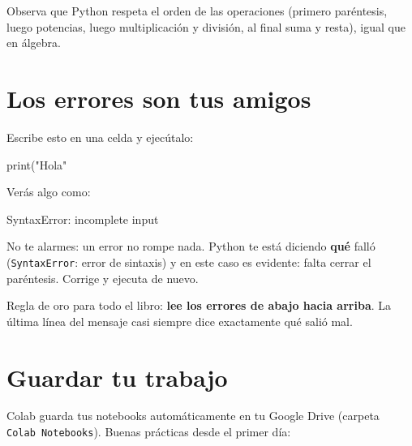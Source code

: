 \documentclass[
  spanish,
  letterpaper,
  DIV=11,
  numbers=noendperiod]{scrreprt}
\newenvironment{Shaded}{\begin{snugshade}}{\end{snugshade}}
\newcommand{\BuiltInTok}[1]{\textcolor[rgb]{0.00,0.23,0.31}{#1}}
\newcommand{\NormalTok}[1]{\textcolor[rgb]{0.00,0.23,0.31}{#1}}
\newcommand{\StringTok}[1]{\textcolor[rgb]{0.13,0.47,0.30}{#1}}
\begin{document}
Observa que Python respeta el orden de las operaciones (primero
paréntesis, luego potencias, luego multiplicación y división, al final
suma y resta), igual que en álgebra.

\section{Los errores son tus amigos}\label{los-errores-son-tus-amigos}

Escribe esto en una celda y ejecútalo:

\begin{Shaded}
\begin{Highlighting}[]
\BuiltInTok{print}\NormalTok{(}\StringTok{"Hola"}
\end{Highlighting}
\end{Shaded}

Verás algo como:

\begin{Shaded}
\begin{Highlighting}[]
\NormalTok{SyntaxError: incomplete input}
\end{Highlighting}
\end{Shaded}

No te alarmes: un error no rompe nada. Python te está diciendo
\textbf{qué} falló (\texttt{SyntaxError}: error de sintaxis) y en este
caso es evidente: falta cerrar el paréntesis. Corrige y ejecuta de
nuevo.

\begin{tcolorbox}[enhanced jigsaw, arc=.35mm, bottomrule=.15mm, bottomtitle=1mm, breakable, colback=white, colbacktitle=quarto-callout-tip-color!10!white, colframe=quarto-callout-tip-color-frame, coltitle=black, left=2mm, leftrule=.75mm, opacityback=0, opacitybacktitle=0.6, rightrule=.15mm, title=\textcolor{quarto-callout-tip-color}{\faLightbulb}\hspace{0.5em}{Tip}, titlerule=0mm, toprule=.15mm, toptitle=1mm]

Regla de oro para todo el libro: \textbf{lee los errores de abajo hacia
arriba}. La última línea del mensaje casi siempre dice exactamente qué
salió mal.

\end{tcolorbox}

\section{Guardar tu trabajo}\label{guardar-tu-trabajo}

Colab guarda tus notebooks automáticamente en tu Google Drive (carpeta
\texttt{Colab\ Notebooks}). Buenas prácticas desde el primer día:
\end{document}
